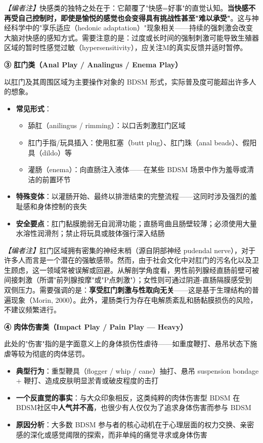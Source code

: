 \documentclass[12pt,UTF8]{ctexbook}
\begin{document}
\textit{【编者注】}快感类的独特之处在于：它颠覆了"快感=好事"的直觉认知。\textbf{当快感不再受自己控制时，即使是愉悦的感觉也会变得具有挑战性甚至"难以承受"}。这与神经科学中的"享乐适应（hedonic adaptation）"现象相关——持续的强刺激会改变大脑对快感的感知方式。需要注意的是：过度或长时间的强制刺激可能导致生殖器区域的暂时性感觉过敏（hypersensitivity），应关注M的真实反馈并适时暂停。

\noindent\textbf{③ 肛门类（Anal Play / Analingus / Enema Play）}

以肛门及其周围区域为主要操作对象的 BDSM 形式，实际普及度可能超出许多人的想象。

\begin{itemize}
	\item \textbf{常见形式}：
	\begin{itemize}
		\item 舔肛（anilingus / rimming）：以口舌刺激肛门区域
		\item 肛门手指/玩具插入：使用肛塞（butt plug）、肛门珠（anal beads）、假阳具（dildo）等
		\item 灌肠（enema）：向直肠注入液体——在某些 BDSM 场景中作为羞辱或清洁的前置环节
	\end{itemize}
	\item \textbf{特殊变体}：以灌肠开始、最终以排泄结束的完整流程——这同时涉及强烈的羞耻感和身体控制的丧失
	\item \textbf{安全要点}：肛门黏膜脆弱无自润滑功能；直肠弯曲且肠壁较薄；必须使用大量水溶性润滑剂；禁止将玩具或肢体强行深入结肠
\end{itemize}

\textit{【编者注】}肛门区域拥有密集的神经末梢（源自阴部神经 pudendal nerve），对于许多人而言是一个潜在的强敏感带。然而，由于社会文化中对肛门的污名化以及卫生顾虑，这一领域常被误解或回避。从解剖学角度看，男性前列腺经直肠前壁可被间接刺激（所谓"前列腺按摩"或"P点刺激"）；女性则可通过阴道-直肠隔膜感受到双侧压力。需要强调的是：\textbf{享受肛门刺激与性取向无关}——这是基于生理结构的普遍现象（Morin, 2000）。此外，灌肠类行为存在电解质紊乱和肠黏膜损伤的风险，不建议频繁进行。

\noindent\textbf{④ 肉体伤害类（Impact Play / Pain Play — Heavy）}

此处的"伤害"指的是字面意义上的身体损伤性虐待——如重度鞭打、悬吊状态下施虐等较为彻底的肉体惩罚。

\begin{itemize}
	\item \textbf{典型行为}：重型鞭具（flogger / whip / cane）抽打、悬吊 suspension bondage + 鞭打、造成皮肤明显淤青或破皮程度的击打
	\item \textbf{一个反直觉的事实}：与大众印象相反，这类纯粹的肉体伤害型 BDSM 在BDSM社区中\textbf{人气并不高}，也很少有人仅仅为了追求身体伤害而参与 BDSM
	\item \textbf{原因分析}：大多数 BDSM 参与者的核心动机在于心理层面的权力交换、亲密感的深化或感觉阈限的探索，而非单纯的痛觉寻求或身体伤害
\end{itemize}
\end{document}
